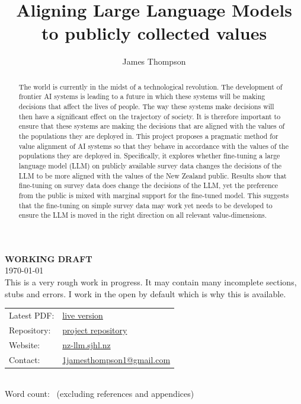 \documentclass[11pt, a4paper, twoside, openright]{report}
\title{Aligning Large Language Models to publicly collected values}
\author{James Thompson}
\date{}
\newcommand{\wordcount}{\IfFileExists{report.count}{}{N/A}}
\begin{document}
\ifdraftmode
\thispagestyle{empty}
\begin{center}
   \vspace*{\fill}
   {\Huge\bfseries WORKING DRAFT}\\[24pt]
   {\Large \today}\\[12pt]
   {\large This is a very rough work in progress. It may contain many incomplete sections, stubs and errors. I work in the open by default which is why this is available.}\\[18pt]
   {\large\begin{tabular}{@{}ll@{}}
   Latest PDF:  & \href{https://raw.githubusercontent.com/1jamesthompson1/AIML589/main/docs/output/AIML589-James-Thompson-LLM-NZ-Value-Alignment.pdf}{live version} \\
   Repository:  & \href{https://github.com/1jamesthompson1/AIML589}{project repository} \\
   Website:     & \href{https://nz-llm.sjhl.nz}{nz-llm.sjhl.nz} \\
   Contact:     & \href{mailto:1jamesthompson1@gmail.com}{1jamesthompson1@gmail.com} \\
   \end{tabular}}\\[12pt]
   {\large Word count: \wordcount\ (excluding references and appendices)}
   \vspace*{\fill}
\end{center}
\newpage

\listoftodos
\fi


\frontmatter

\begin{abstract}

The world is currently in the midst of a technological revolution. The development of frontier AI systems is leading to a future in which these systems will be making decisions that affect the lives of people. The way these systems make decisions will then have a significant effect on the trajectory of society. It is therefore important to ensure that these systems are making the decisions that are aligned with the values of the populations they are deployed in. This project proposes a pragmatic method for value alignment of AI systems so that they behave in accordance with the values of the populations they are deployed in. Specifically, it explores whether fine-tuning a large language model (LLM) on publicly available survey data changes the decisions of the LLM to be more aligned with the values of the New Zealand public. Results show that fine-tuning on survey data does change the decisions of the LLM, yet the preference from the public is mixed with marginal support for the fine-tuned model. This suggests that the fine-tuning on simple survey data may work yet needs to be developed to ensure the LLM is moved in the right direction on all relevant value-dimensions.

\end{abstract}
\end{document}

